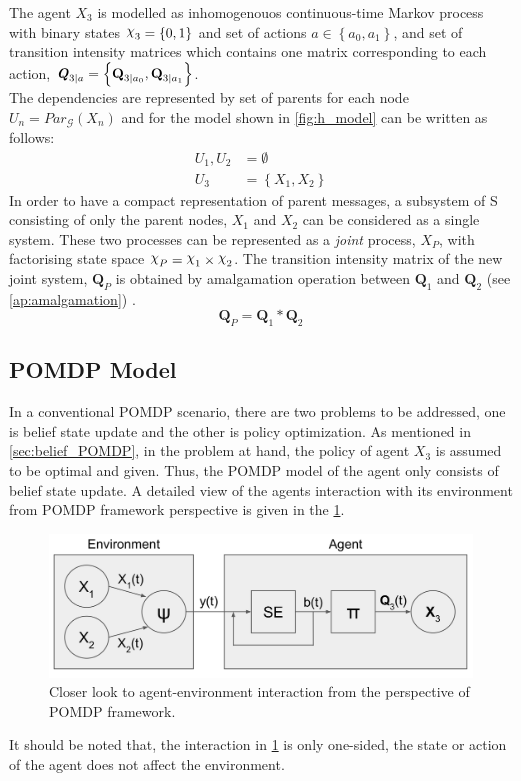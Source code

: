 The agent  $ X_{3} $ is modelled as inhomogenouos continuous-time Markov process with binary states $ \rchi_{3} = \left\lbrace 0, 1 \right\rbrace  $ and set of actions $ a \in \left\lbrace a_0, a_1\right\rbrace  $, and set of transition intensity matrices which contains one matrix corresponding to each action, $ \textbf{\textit{Q}}_{3 \mid a} = \left\lbrace \textbf{Q}_{3\mid a_{0}}, \textbf{Q}_{3\mid a_{1}} \right\rbrace $.\\
The dependencies are represented by set of parents for each node $ U_{n} = Par_{\mathcal{G}}(X_n) $ and for the model shown in \cref{fig:h_model} can be written as follows:
\begin{align*}
U_{1}, U_{2} & = \emptyset \\
U_{3} & = \left\lbrace X_1, X_2 \right\rbrace 
\end{align*}
In order to have a compact representation of parent messages, a subsystem of S consisting of only the parent nodes, $ X_1 $ and $ X_2 $ can be considered as a single system. These two processes can be represented as a \textit{joint} process, $ X_P $, with factorising state space $ \rchi_{P} = \rchi_1 \times \rchi_2  $. The transition intensity matrix of the new joint system, $ \textbf{Q}_P $ is obtained by amalgamation operation between $ \textbf{Q}_{1} $ and  $ \textbf{Q}_{2} $ (see \cref{ap:amalgamation}) \cite{Nodelman1995}.
\begin{equation}
\textbf{Q}_P = \textbf{Q}_{1} * \textbf{Q}_{2}
\end{equation}

\subsection{POMDP Model}
In a conventional POMDP scenario, there are two problems to be addressed, one is belief state update and the other is policy optimization. As mentioned in \cref{sec:belief_POMDP}, in the problem at hand, the policy of agent $ X_3 $ is assumed to be optimal and given. Thus, the POMDP model of the agent only consists of belief state update. A detailed view of the agents interaction with its environment from POMDP framework perspective is given in the \cref{fig:POMDP_pers}. \\
\begin{figure}[H]
	\begin{center}
		\includegraphics[width=.75\textwidth]{figures/POMDP_graph}
		\caption{Closer look to agent-environment interaction from the perspective of POMDP framework.}
		\label{fig:POMDP_pers}
	\end{center}
\end{figure}
It should be noted that, the interaction in \cref{fig:POMDP_pers} is only one-sided, the state or action of the agent does not affect the environment.
